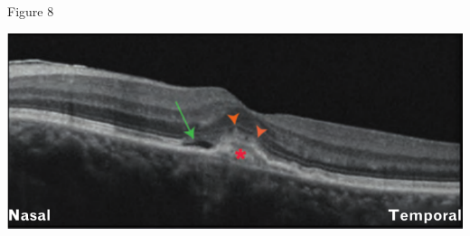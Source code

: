 \documentclass{beamer}
\begin{document}
\begin{frame}{Figure 8}
    \begin{center}
        \includegraphics[width=\textwidth]{8.png}
    \end{center}
\end{frame}
\end{document}
